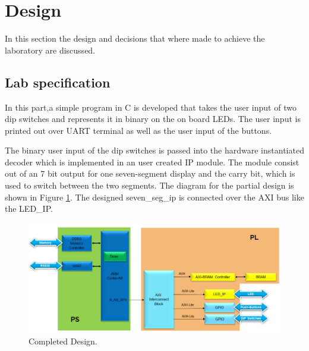 \section{Design}\label{sec: Design}
In this section the design and decisions that where made to achieve the laboratory are discussed.
\subsection{Lab specification}\label{subsec: Lab specification}
In this part,a simple program in C is developed that takes the user input of two dip switches and represents it in binary on the on board LEDs. The user input is printed out over UART terminal as well as the user input of the buttons. 

The binary user input of the dip switches is passed into the hardware instantiated decoder which is implemented in an user created IP module. The module consist out of an 7 bit output for one seven-segment display and the carry bit, which is used to switch between the two segments.
The diagram for the partial design is shown in Figure \ref{fig: Vivado_lab4_CompletedDesign}. The designed seven\_seg\_ip is connected over the AXI bus like the LED\_IP. 
\begin{figure}[H]
	\centering
	\includegraphics[width=1.0\textwidth]{01_images/Vivado_lab4_CompletedDesign.PNG}
	\caption{Completed Design.}
	\label{fig: Vivado_lab4_CompletedDesign}
\end{figure}

